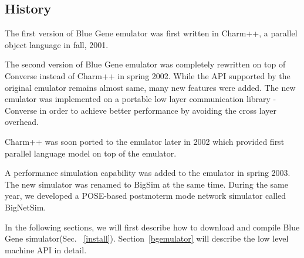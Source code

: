 \documentclass[10pt]{article}
\begin{document}
\subsection{History}

The first version of Blue Gene emulator was first written in Charm++, a 
parallel object language in fall, 2001. 

The second version of Blue Gene emulator was completely rewritten on top 
of Converse instead of Charm++ in spring 2002. 
While the API supported by the original emulator remains almost same,
many new features were added.
The new emulator was implemented on a portable low layer communication 
library - Converse in order to achieve better 
performance by avoiding the cross layer overhead.

Charm++ was soon ported to the emulator later in 2002 which provided
first parallel language model on top of the emulator.

A performance simulation capability was added to the emulator in spring 2003.
The new simulator was renamed to BigSim at the same time.
During the same year, we developed a POSE-based postmoterm mode network
simulator called BigNetSim.


In the following sections, we will first describe how to download and compile
Blue Gene simulator(Sec. ~\ref{install}). Section~\ref{bgemulator} will describe
the low level machine API in detail. 









\end{document}
